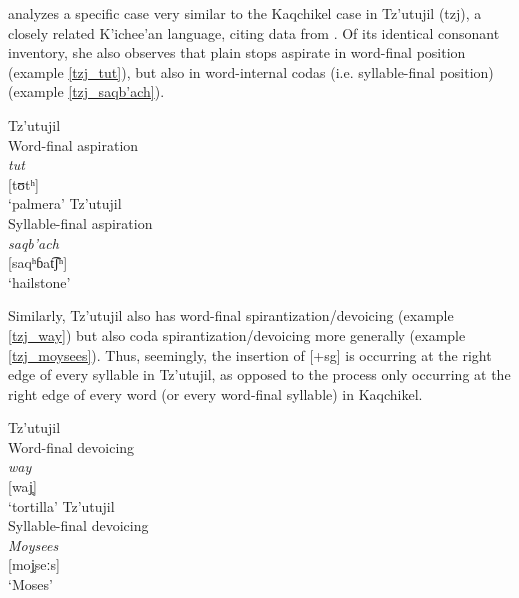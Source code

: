 \documentclass[output=paper,colorlinks,citecolor=brown]{langscibook}
\begin{document}
\citet{wax_cavallaro_2020} analyzes a specific case very similar to the Kaqchikel case in Tz’utujil (tzj), a closely related K’ichee’an language, citing data from \citet{dayley_1985}. Of its identical consonant inventory, she also observes that plain stops aspirate in word-final position (example \ref{tzj_tut}), but also in word-internal codas (i.e. syllable-final position) (example \ref{tzj_saqb’ach}).
\begin{multicols}{2}
\ea
    \ea\label{tzj_tut}
    Tz’utujil   \citep{dayley_1985}\\
    Word-final aspiration \\
    \gll\emph{tut}    \\
    {}[tʊtʰ]   \\
    \glt ‘palmera’ 
    \columnbreak
        \ex\label{tzj_saqb’ach}
        Tz’utujil \citep{dayley_1985}\\
        Syllable-final aspiration \\
        \gll\emph{saqb’ach} \\
        {}[saqʰɓat͡ʃʰ]  \\
        \glt ‘hailstone’ 
    \z    
\z
\end{multicols}

Similarly, Tz’utujil also has word-final spirantization/devoicing (example \ref{tzj_way}) but also coda spirantization/devoicing more generally (example \ref{tzj_moysees}). Thus, seemingly, the insertion of [+sg] is occurring at the right edge of every syllable in Tz’utujil, as opposed to the process only occurring at the right edge of every word (or every word-final syllable) in Kaqchikel.
\begin{multicols}{2}
\ea
    \ea\label{tzj_way}
    Tz’utujil  \citep{dayley_1985} \\
    Word-final devoicing \\
    \gll\emph{way}    \\
    {}[waj̥]   \\
    \glt ‘tortilla’ 
    \columnbreak
        \ex\label{tzj_moysees}
         Tz’utujil \citep{dayley_1985}\\
        Syllable-final devoicing \\
        \gll\emph{Moysees} \\
        {}[moj̥seːs]  \\
        \glt ‘Moses’ 
    \z
\z
\end{multicols}
\end{document}
